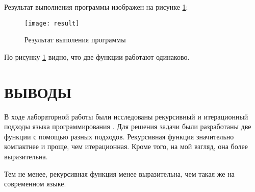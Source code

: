 \documentclass[a4paper,14pt]{extarticle}
\begin{document}
Результат выполнения программы изображен на рисунке \ref{fig:result}:

\begin{figure}[H]
    \centering
    \texttt{[image: result]}
    \caption{Результат выполения программы}
    \label{fig:result}
\end{figure}

По рисунку \ref{fig:result} видно, что две функции работают одинаково.

\section*{ВЫВОДЫ}
В ходе лабораторной работы были исследованы рекурсивный и итерационный подходы
языка программирования . Для решения задачи были разработаны две
функции с помощью разных подходов. Рекурсивная функция значительно компактнее и
проще, чем итерационная. Кроме того, на мой взгляд, она более выразительна.

Тем не менее, рекурсивная функция менее выразительна, чем такая же на
современном языке.
\end{document}
